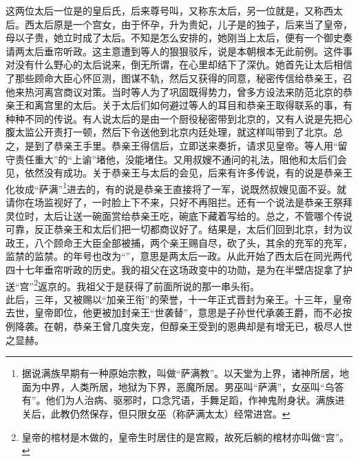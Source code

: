 这两位太后一位是的皇后氏，后来尊号叫，又称东太后，另一位就是，又称西太后。西太后原是一个宫女，由于怀孕，升为贵妃，儿子是的独子，后来当了皇帝，母以子贵，她立时成了太后。不知是怎么安排的，她刚当上太后，便有一个御史奏请两太后垂帘听政。这主意遭到等人的狠狠驳斥，说是本朝根本无此前例。这件事对没有什么野心的太后说来，倒无所谓，在心里却结下了深仇。她首先让太后相信了那些顾命大臣心怀叵测，图谋不轨，然后又获得的同意，秘密传信给恭亲王，召他来热河离宫商议对策。当时等人为了巩固既得势力，曾多方设法来防范北京的恭亲王和离宫里的太后。关于太后们如何避过等人的耳目和恭亲王取得联系的事，有种种不同的传说。有人说太后的是由一个厨役秘密带到北京的，又有人说是先把心腹太监公开责打一顿，然后下令送他到北京内廷处理，就这样叫带到了北京。总之，是到了恭亲王手里。恭亲王得信后，立即送来奏折，请求见皇帝。等人用“留守责任重大”的“上谕”堵他，没能堵住。又用叔嫂不通问的礼法，阻他和太后们会见，依然没有成功。关于恭亲王与太后的会见，后来有许多传说，有的说是恭亲王化妆成“萨满”\footnote{据说满族早期有一种原始宗教，叫做“萨满教”。以天堂为上界，诸神所居，地面为中界，人类所居，地狱为下界，恶魔所居。男巫叫“萨满”，女巫叫“乌答有”。他们为人治病、驱邪时，口念咒语，手舞足蹈，作神鬼附身状。满族进关后，此教仍然保存，但只限女巫（称萨满太太）经常进宫。}进去的，有的说是恭亲王直接将了一军，说既然叔嫂见面不妥。就请你在场监视好了，一时脸上下不来，只好不再阻拦。还有一个说法是恭亲王祭拜灵位时，太后让送一碗面赏给恭亲王吃，碗底下藏着写给的。总之，不管哪个传说可靠，反正恭亲王和太后们把一切都商议好了。结果是，太后们回到北京，封为议政王，八个顾命王大臣全部被捕，两个亲王赐自尽，砍了头，其余的充军的充军，监禁的监禁。的年号也改为“”，意思是两太后一政。从此开始了西太后在同光两代四十七年垂帘听政的历史。我的祖父在这场政变中的功勋，是为在半壁店捉拿了护送“宫”\footnote{皇帝的棺材是木做的，皇帝生时居住的是宫殿，故死后躺的棺材亦叫做“宫”。}返京的。我祖父于是获得了前面所说的那一串头衔。\\

此后，三年，又被赐以“加亲王衔”的荣誉，十一年正式晋封为亲王。十三年，皇帝去世，皇帝即位，他更被加封亲王“世袭替”，意思是子孙世代承袭王爵，而不必按例降袭。在朝，恭亲王曾几度失宠，但醇亲王受到的恩典却是有增无已，极尽人世之显赫。\\

